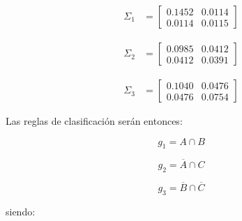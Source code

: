 \begin{minipage}{\linewidth}
  \centering
  \begin{minipage}{0.25\linewidth}
        \begin{align*}
            \Sigma_1 &= \begin{bmatrix}
            0.1452 & 0.0114 \\
            0.0114 & 0.0115
            \end{bmatrix}
        \end{align*}
  \end{minipage}
  \hspace{0.05\linewidth}
  \begin{minipage}{0.25\linewidth}
        \begin{align*}
            \Sigma_2 &= \begin{bmatrix}
            0.0985 & 0.0412 \\
            0.0412 & 0.0391
            \end{bmatrix}
        \end{align*}
  \end{minipage}
  \hspace{0.05\linewidth}
  \begin{minipage}{0.25\linewidth}
        \begin{align*}
            \Sigma_3 &= \begin{bmatrix}
            0.1040 & 0.0476 \\
            0.0476 & 0.0754
            \end{bmatrix}
        \end{align*}
  \end{minipage}
\end{minipage}
\vskip0.5cm
Las reglas de clasificación serán entonces:
\vskip0.5cm
\begin{minipage}{\linewidth}
  \centering
  \begin{minipage}{0.25\linewidth}
  $$
    g_1 = A \cap B
  $$
  \end{minipage}
  \hspace{0.05\linewidth}
  \begin{minipage}{0.25\linewidth}
  $$
    g_2 = \overline{A} \cap C
  $$
  \end{minipage}
  \hspace{0.05\linewidth}
  \begin{minipage}{0.25\linewidth}
  $$
    g_3 = \overline{B} \cap \overline{C}
  $$
  \end{minipage}
\end{minipage}
\vskip0.5cm
siendo:

